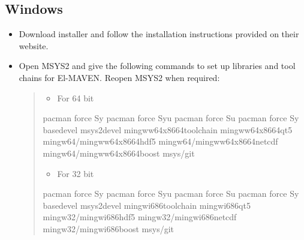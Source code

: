 \documentclass[letterpaper,10pt,english,openany,oneside]{sphinxmanual}
\begin{document}
\subsection{Windows}
\label{\detokenize{Build:windows}}\begin{itemize}
\item {} 
Download  installer and follow the installation instructions provided on their website.

\item {} 
Open MSYS2 and give the following commands to set up libraries and tool chains for El-MAVEN. Reopen MSYS2 when required:
\begin{quote}
\begin{itemize}
\item {} 
For 64 bit

\end{itemize}

%
\begin{sphinxVerbatim}[commandchars=\\\{\}]
\PYGZdl{} pacman \PYGZhy{}\PYGZhy{}force \PYGZhy{}Sy
\PYGZdl{} pacman \PYGZhy{}\PYGZhy{}force \PYGZhy{}Syu
\PYGZdl{} pacman \PYGZhy{}\PYGZhy{}force \PYGZhy{}Su
\PYGZdl{} pacman \PYGZhy{}\PYGZhy{}force \PYGZhy{}Sy base\PYGZhy{}devel msys2\PYGZhy{}devel mingw\PYGZhy{}w64\PYGZhy{}x86\PYGZus{}64\PYGZhy{}toolchain mingw\PYGZhy{}w64\PYGZhy{}x86\PYGZus{}64\PYGZhy{}qt5 mingw64/mingw\PYGZhy{}w64\PYGZhy{}x86\PYGZus{}64\PYGZhy{}hdf5 mingw64/mingw\PYGZhy{}w64\PYGZhy{}x86\PYGZus{}64\PYGZhy{}netcdf mingw64/mingw\PYGZhy{}w64\PYGZhy{}x86\PYGZus{}64\PYGZhy{}boost msys/git
\end{sphinxVerbatim}
\begin{itemize}
\item {} 
For 32 bit

\end{itemize}

%
\begin{sphinxVerbatim}[commandchars=\\\{\}]
\PYGZdl{} pacman \PYGZhy{}\PYGZhy{}force \PYGZhy{}Sy
\PYGZdl{} pacman \PYGZhy{}\PYGZhy{}force \PYGZhy{}Syu
\PYGZdl{} pacman \PYGZhy{}\PYGZhy{}force \PYGZhy{}Su
\PYGZdl{} pacman \PYGZhy{}\PYGZhy{}force \PYGZhy{}Sy base\PYGZhy{}devel msys2\PYGZhy{}devel mingw\PYGZhy{}i686\PYGZhy{}toolchain mingw\PYGZhy{}i686\PYGZhy{}qt5 mingw32/mingw\PYGZhy{}i686\PYGZhy{}hdf5 mingw32/mingw\PYGZhy{}i686\PYGZhy{}netcdf mingw32/mingw\PYGZhy{}i686\PYGZhy{}boost msys/git
\end{sphinxVerbatim}
\end{quote}


\end{itemize}
\end{document}
